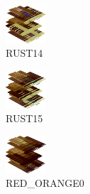 \hspace{0.1cm}
\begin{minipage}[b]{0.15\linewidth}
\begin{figure}[H]                                                          
  \centering                                                             
  \begin{adjustbox}{width=1.5cm,center}                                   
  \includegraphics[width=1.5cm]{src/colorspace_colourflow/flows/colourflow_30-45.png}%
  \end{adjustbox}                                                        
\caption*{RUST14}                                           
\end{figure}                                                               
\end{minipage}
\hspace{0.1cm}
\begin{minipage}[b]{0.15\linewidth}
\begin{figure}[H]                                                          
  \centering                                                             
  \begin{adjustbox}{width=1.5cm,center}                                   
  \includegraphics[width=1.5cm]{src/colorspace_colourflow/flows/colourflow_31-45.png}%
  \end{adjustbox}                                                        
\caption*{RUST15}                                           
\end{figure}                                                               
\end{minipage}
\hspace{0.1cm}
\begin{minipage}[b]{0.15\linewidth}
\begin{figure}[H]                                                          
  \centering                                                             
  \begin{adjustbox}{width=1.5cm,center}                                   
  \includegraphics[width=1.5cm]{src/colorspace_colourflow/flows/colourflow_32-45.png}%
  \end{adjustbox}                                                        
\caption*{RED\_ORANGE0}                                           
\end{figure}                                                               
\end{minipage}

